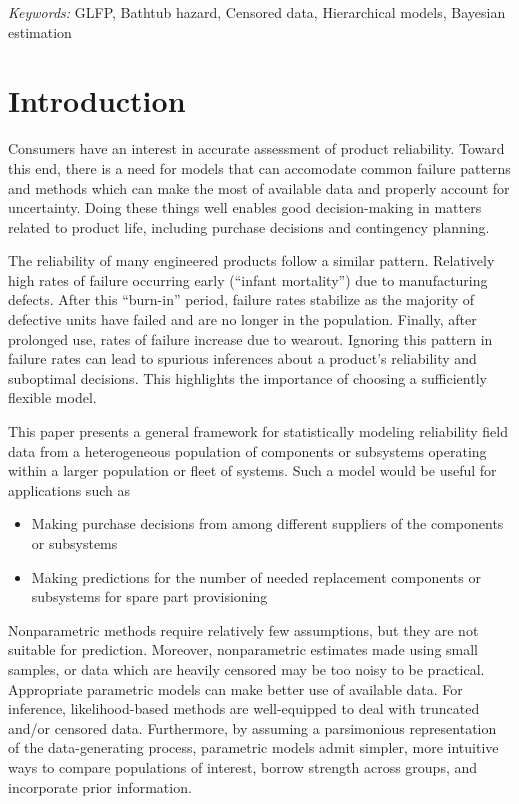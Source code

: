 \documentclass[12pt]{article}
\begin{document}
\noindent%
{\it Keywords:} GLFP, Bathtub hazard, Censored data, Hierarchical models, Bayesian estimation
\vfill

\newpage
\tableofcontents
\newpage
{} %
\section{Introduction}
Consumers have an interest in accurate assessment of product reliability. Toward this end, there is a need for models that can accomodate common failure patterns and methods which can make the most of available data and properly account for uncertainty. Doing these things well enables good decision-making in matters related to product life, including purchase decisions and contingency planning.

The reliability of many engineered products follow a similar pattern. Relatively high rates of failure occurring early (``infant mortality'') due to manufacturing defects.  After this ``burn-in'' period, failure rates stabilize as the majority of defective units have failed and are no longer in the population.  Finally, after prolonged use, rates of failure increase due to wearout.  Ignoring this pattern in failure rates can lead to spurious inferences about a product's reliability and suboptimal decisions. This highlights the importance of choosing a sufficiently flexible model.



This paper presents a general framework for statistically modeling reliability field data from a heterogeneous population of components or subsystems operating within a larger population or fleet of systems. Such a model would be useful for applications such as

\begin{itemize}
\item Making purchase decisions from among different suppliers of the components or subsystems
\item Making predictions for the number of needed replacement components or subsystems for spare part provisioning
\end{itemize}

Nonparametric methods require relatively few assumptions, but they are not suitable for prediction. Moreover, nonparametric estimates made using small samples, or data which are heavily censored may be too noisy to be practical. Appropriate parametric models can make better use of available data. For inference, likelihood-based methods are well-equipped to deal with truncated and/or censored data. Furthermore, by assuming a parsimonious representation of the data-generating process, parametric models admit simpler, more intuitive ways to compare populations of interest, borrow strength across groups, and incorporate prior information. 
\end{document}
